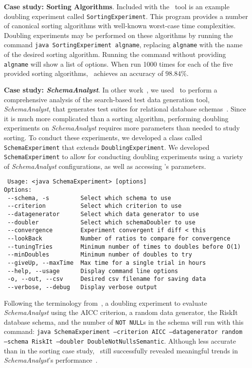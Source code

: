     \lstset{language=bash}

    {\bf Case study: Sorting Algorithms}.  Included with the
    \toolname~tool is an example doubling experiment called
    \texttt{SortingExperiment}.  This program provides a number of
    canonical sorting algorithms with well-known worst-case time
    complexities.  Doubling experiments may be performed on these
    algorithms by running the command \texttt{java SortingExperiment
    algname}, replacing \texttt{algname} with the name of the desired
    sorting algorithm. Running the command without providing
    \texttt{algname} will show a list of options. When run 1000 times
    for each of the five provided sorting algorithms, \toolname~achieves
    an accuracy of $98.84\%$.

    {\bf Case study: \textit{SchemaAnalyst}}. In other
    work~\cite{kinneer2015}, we used \toolname~to perform a
    comprehensive analysis of the search-based test data generation
    tool, \textit{SchemaAnalyst}, that generates test suites for
    relational database schemas~\cite{kapfhammer2013}. Since it is much
    more complicated than a sorting algorithm, performing doubling
    experiments on \textit{SchemaAnalyst} requires more parameters than
    needed to study sorting.  To conduct these experiments, we developed
    a class called \texttt{SchemaExperiment} that extends
    \texttt{DoublingExperiment}.  We developed \texttt{SchemaExperiment}
    to allow for conducting doubling experiments using a variety of
    \textit{SchemaAnalyst} configurations, as well as accessing
    \toolname's parameters.

    \vspace*{-.075in}

{\scriptsize
\begin{verbatim}
 Usage: <java SchemaExperiment> [options]
Options:
 --schema, -s         Select which schema to use
 --criterion          Select which criterion to use
 --datagenerator      Select which data generator to use
 --doubler            Select which schemaDoubler to use
 --convergence        Experiment convergent if diff < this
 --lookBack           Number of ratios to compare for convergence
 --tuningTries        Minimum number of times to doubles before O(1)
 --minDoubles         Minimum number of doubles to try
 --giveUp, --maxTime  Max time for a single trial in hours
 --help, --usage      Display command line options
 -o, --out, --csv     Desired csv filename for saving data 
 --verbose, --debug   Display verbose output
\end{verbatim}
}

\vspace*{-.075in}

Following the terminology from~\cite{kempka2015}, a doubling experiment
to evaluate \textit{SchemaAnalyst} using the AICC criterion, a random
data generator, the RiskIt database schema, and the number of
\texttt{NOT NULL}s in the schema will run with this command:
\texttt{java SchemaExperiment --criterion AICC --datagenerator random
--schema RiskIt --doubler DoubleNotNullsSemantic}.  Although less accurate
than in the sorting case study, \toolname~still successfully revealed
meaningful trends in \textit{SchemaAnalyst}'s
performance~\cite{kinneer2015}.


